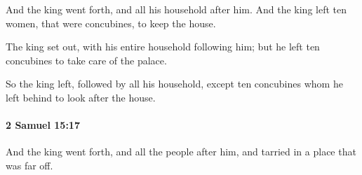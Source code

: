 			\begin{versebox}
					\item[BHS] 
					\item[ASV] And the king went forth, and all his household after him. And the king left ten women, that were concubines, to keep the house.
					\item[NIV] The king set out, with his entire household following him; but he left ten concubines to take care of the palace.
					\item[NRSV] So the king left, followed by all his household, except ten concubines whom he left behind to look after the house.
			\end{versebox}

		\paragraph{2 Samuel 15:17} %
			\label{2SAMUEL-15-17}

			And the king went forth, and all the people after him, and tarried in a place that was far off.

